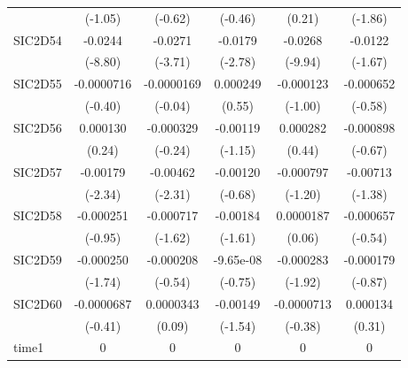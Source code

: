 \begin{table}[htbp]
\begin{tabular}{l*{5}{c}}
            &     (-1.05)         &     (-0.62)         &     (-0.46)         &      (0.21)         &     (-1.86)         \\
SIC2D54     &     -0.0244\sym{***}&     -0.0271\sym{***}&     -0.0179\sym{**} &     -0.0268\sym{***}&     -0.0122         \\
            &     (-8.80)         &     (-3.71)         &     (-2.78)         &     (-9.94)         &     (-1.67)         \\
SIC2D55     &  -0.0000716         &  -0.0000169         &    0.000249         &   -0.000123         &   -0.000652         \\
            &     (-0.40)         &     (-0.04)         &      (0.55)         &     (-1.00)         &     (-0.58)         \\
SIC2D56     &    0.000130         &   -0.000329         &    -0.00119         &    0.000282         &   -0.000898         \\
            &      (0.24)         &     (-0.24)         &     (-1.15)         &      (0.44)         &     (-0.67)         \\
SIC2D57     &    -0.00179\sym{*}  &    -0.00462\sym{*}  &    -0.00120         &   -0.000797         &    -0.00713         \\
            &     (-2.34)         &     (-2.31)         &     (-0.68)         &     (-1.20)         &     (-1.38)         \\
SIC2D58     &   -0.000251         &   -0.000717         &    -0.00184         &   0.0000187         &   -0.000657         \\
            &     (-0.95)         &     (-1.62)         &     (-1.61)         &      (0.06)         &     (-0.54)         \\
SIC2D59     &   -0.000250         &   -0.000208         &   -9.65e-08         &   -0.000283         &   -0.000179         \\
            &     (-1.74)         &     (-0.54)         &     (-0.75)         &     (-1.92)         &     (-0.87)         \\
SIC2D60     &  -0.0000687         &   0.0000343         &    -0.00149         &  -0.0000713         &    0.000134         \\
            &     (-0.41)         &      (0.09)         &     (-1.54)         &     (-0.38)         &      (0.31)         \\
time1       &           0         &           0         &           0         &           0         &           0         \\

\end{tabular}
\end{table}
